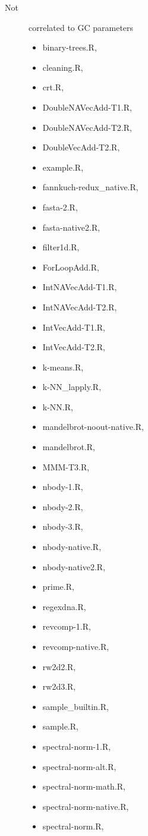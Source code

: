 \documentclass[12pt]{article}
\begin{document}
{\small
\begin{description}
\item [Not] correlated to GC parameters
\begin{itemize}
\item binary-trees.R, 
\item cleaning.R, 
\item crt.R, 
\item DoubleNAVecAdd-T1.R, 
\item DoubleNAVecAdd-T2.R, 
\item DoubleVecAdd-T2.R, 
\item example.R, 
\item fannkuch-redux\_native.R, 
\item fasta-2.R, 
\item fasta-native2.R, 
\item filter1d.R, 
\item ForLoopAdd.R, 
\item IntNAVecAdd-T1.R, 
\item IntNAVecAdd-T2.R, 
\item IntVecAdd-T1.R, 
\item IntVecAdd-T2.R, 
\item k-means.R, 
\item k-NN\_lapply.R, 
\item k-NN.R, 
\item mandelbrot-noout-native.R, 
\item mandelbrot.R, 
\item MMM-T3.R, 
\item nbody-1.R, 
\item nbody-2.R, 
\item nbody-3.R, 
\item nbody-native.R, 
\item nbody-native2.R, 
\item prime.R, 
\item regexdna.R, 
\item revcomp-1.R, 
\item revcomp-native.R, 
\item rw2d2.R, 
\item rw2d3.R, 
\item sample\_builtin.R, 
\item sample.R, 
\item spectral-norm-1.R, 
\item spectral-norm-alt.R, 
\item spectral-norm-math.R, 
\item spectral-norm-native.R, 
\item spectral-norm.R, 
\end{itemize}


\end{description}}
\end{document}
